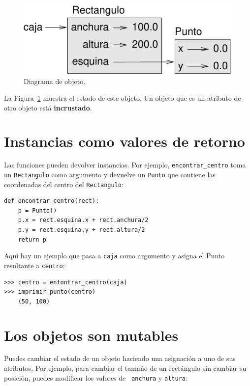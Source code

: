 \documentclass[10pt]{book}
\begin{document}
\begin{figure}
\centerline
{\includegraphics[scale=0.8]{figs/rectangle.pdf}}
\caption{Diagrama de objeto.}
\label{fig.rectangle}
\end{figure}


La Figura~\ref{fig.rectangle} muestra el estado de este objeto.
Un objeto que es un atributo de otro objeto está {\bf incrustado}.


\section{Instancias como valores de retorno}

Las funciones pueden devolver instancias.  Por ejemplo, \verb"encontrar_centro"
toma un {\tt Rectangulo} como argumento y devuelve un {\tt Punto}
que contiene las coordenadas del centro del {\tt Rectangulo}:

\begin{verbatim}
def encontrar_centro(rect):
    p = Punto()
    p.x = rect.esquina.x + rect.anchura/2
    p.y = rect.esquina.y + rect.altura/2
    return p
\end{verbatim}
%
Aquí hay un ejemplo que pasa a {\tt caja} como argumento y asigna
el Punto resultante a {\tt centro}:

\begin{verbatim}
>>> centro = entontrar_centro(caja)
>>> imprimir_punto(centro)
    (50, 100)
\end{verbatim}
%

\section{Los objetos son mutables}

Puedes cambiar el estado de un objeto haciendo una asignación a uno de
sus atributos.  Por ejemplo, para cambiar el tamaño de un rectángulo
sin cambiar su posición, puedes modificar los valores de {\tt
anchura} y {\tt altura}:
\end{document}
